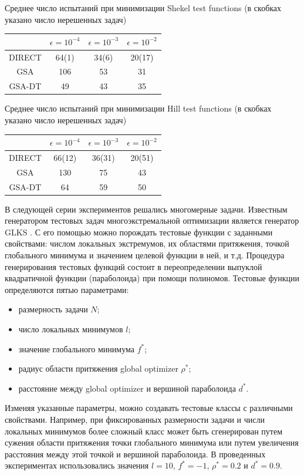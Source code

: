 \documentclass[entropy,article,submit,moreauthors,pdftex]{Definitions/mdpi}
\begin{document}
\begin{specialtable}[H] 
	\caption{Среднее число испытаний при минимизации Shekel test functions (в скобках указано число нерешенных задач)}\label{table:average_Shekel}
	\center
\begin{tabular}{cccc}
\toprule
        & \textbf{$\epsilon = 10^{-4}$} & \textbf{$\epsilon = 10^{-3}$} & \textbf{$\epsilon = 10^{-2}$} \\
\midrule													
DIRECT         & 64(1) &  34(6)   & 20(17)    \\
GSA            & 106  & 53  &  31   \\ 
GSA-DT         & 49   & 43  &  35   \\

\bottomrule
\end{tabular}
\end{specialtable}

\begin{specialtable}[H] 
	\caption{Среднее число испытаний при минимизации Hill test functions (в скобках указано число нерешенных задач)}\label{table:average_Hill}
	\center
\begin{tabular}{cccc}
\toprule
        & \textbf{$\epsilon = 10^{-4}$} & \textbf{$\epsilon = 10^{-3}$} & \textbf{$\epsilon = 10^{-2}$} \\
\midrule					  
DIRECT                & 66(12) & 36(31)  & 20(51)  \\
GSA                   & 130    & 75      & 43      \\
GSA-DT                & 64     & 59      & 50      \\
\bottomrule
\end{tabular}
\end{specialtable}

В следующей серии экспериментов решались многомерные задачи. 
Известным генератором тестовых задач многоэкстремальной оптимизации является генератор GLKS \cite{Gaviano2003}. С его помощью можно порождать тестовые функции с заданными свойствами: числом локальных экстремумов, их областями притяжения, точкой глобального минимума и значением целевой функции в ней, и т.д.
Процедура генерирования тестовых функций состоит в переопределении выпуклой квадратичной функции (параболоида) при помощи полиномов. Тестовые функции определяются пятью параметрами:
\begin{itemize}
	\item размерность задачи $N$;
	\item число локальных минимумов $l$;
	\item значение глобального минимума $f^*$;
	\item радиус области притяжения global optimizer $\rho^*$;
	\item расстояние между global optimizer и вершиной параболоида $d^*$.
\end{itemize}
Изменяя указанные параметры, можно создавать тестовые классы с различными свойствами. Например, при фиксированных размерности задачи и числи локальных минимумов более сложный класс может быть сгенерирован путем сужения области притяжения точки глобального минимума или путем увеличения расстояния между этой точкой и вершиной параболоида.
В проведенных экспериментах использовались значения $l=10$, $f^*=-1$, $\rho^*=0.2$ и $d^*=0.9$.
\end{document}
